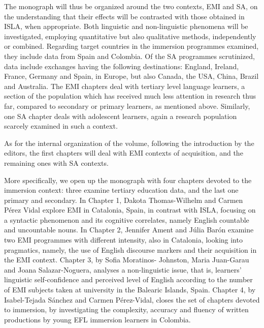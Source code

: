 \documentclass[12pt]{article}
\newenvironment{styleStandard}{\setlength\leftskip{0cm}\setlength\rightskip{0cm plus 1fil}\setlength\parindent{0cm}\setlength\parfillskip{0pt plus 1fil}\setlength\parskip{0in plus 1pt}\writerlistparindent\writerlistleftskip\leavevmode\normalfont\normalsize\writerlistlabel\ignorespaces}{\unskip\vspace{0.111in plus 0.0111in}\par}
\newcommand\writerlistleftskip{}
\newcommand\writerlistparindent{}
\newcommand\writerlistlabel{}
\begin{document}
\begin{styleStandard}
The monograph will thus be organized around the two contexts, EMI and SA, on the understanding that their effects will be contrasted with those obtained in ISLA, when appropriate. Both linguistic and non-linguistic phenomena will be investigated, employing quantitative but also qualitative methods, independently or combined. Regarding target countries in the immersion programmes examined, they include data from Spain and Colombia. Of the SA programmes scrutinized, data include exchanges having the following destinations: England, Ireland, France, Germany and Spain, in Europe, but also Canada, the USA, China, Brazil and Australia. The EMI chapters deal with tertiary level language learners, a section of the population which has received much less attention in research thus far, compared to secondary or primary learners, as mentioned above. Similarly, one SA chapter deals with adolescent learners, again a research population scarcely examined in such a context.
\end{styleStandard}

\begin{styleStandard}
As for the internal organization of the volume, following the introduction by the editors, the first chapters will deal with EMI contexts of acquisition, and the remaining ones with SA contexts. 
\end{styleStandard}

\begin{styleStandard}
More specifically, we open up the monograph with four chapters devoted to the immersion context: three examine tertiary education data, and the last one primary and secondary. In Chapter 1, Dakota Thomas-Wilhelm and Carmen Pérez Vidal explore EMI in Catalonia, Spain, in contrast with ISLA, focusing on a syntactic phenomenon and its cognitive correlates, namely English countable and uncountable nouns. In Chapter 2, Jennifer Ament and Júlia Barón examine two EMI programmes with different intensity, also in Catalonia, looking into pragmatics, namely, the use of English discourse markers and their acquisition in the EMI context. Chapter 3, by Sofia Moratinos- Johnston, Maria Juan-Garau and Joana Salazar-Noguera, analyses a non-linguistic issue, that is, learners’ linguistic self-confidence and perceived level of English according to the number of EMI subjects taken at university in the Balearic Islands, Spain. Chapter 4, by Isabel-Tejada Sánchez and Carmen Pérez-Vidal, closes the set of chapters devoted to immersion, by investigating the complexity, accuracy and fluency of written productions by young EFL immersion learners in Colombia.
\end{styleStandard}
\end{document}
